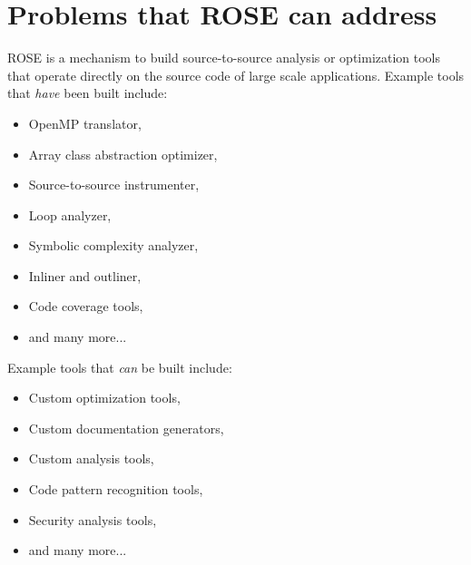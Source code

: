\section{Problems that ROSE can address}
    ROSE is a mechanism to build source-to-source analysis or 
optimization tools that operate directly on the source code of large 
scale applications.  Example tools that {\em have} been built include:
\begin{itemize}
   \item OpenMP translator,
   \item Array class abstraction optimizer,
   \item Source-to-source instrumenter,
   \item Loop analyzer,
   \item Symbolic complexity analyzer,
   \item Inliner and outliner,
   \item Code coverage tools,
   \item and many more...
\end{itemize}
Example tools that {\em can} be built include:
\begin{itemize}
   \item Custom optimization tools,
   \item Custom documentation generators,
   \item Custom analysis tools,
   \item Code pattern recognition tools,
   \item Security analysis tools,
   \item and many more...
\end{itemize}
